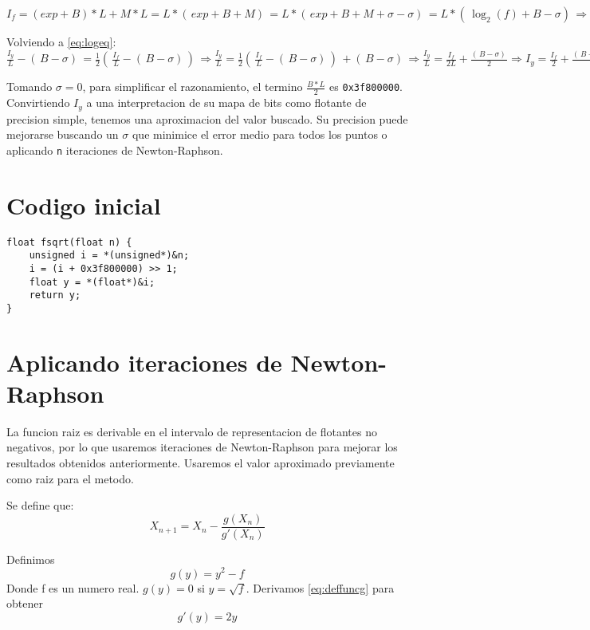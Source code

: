 \documentclass[]{article}
\begin{document}
\(I_f = (exp + B)*L + M*L = L*(\,exp+B+M)\,=L*(\,exp+B+M+\sigma-\sigma)\,=L*(\,\log_2(f)+B-\sigma)\,\Rightarrow\frac{I_f}{L}-(\,B-\sigma)\,=\log_2(f)\)

Volviendo a \eqref{eq:logeq}: \(\frac{I_y}{L}-(\,B-\sigma)\,=\frac{1}{2}(\, \frac{I_f}{L}-(\,B-\sigma)\,)\,\Rightarrow \frac{I_y}{L}=\frac{1}{2}(\,\frac{I_f}{L}-(\,B-\sigma)\,)\,+(\,B-\sigma)\,\Rightarrow  \frac{I_y}{L}=\frac{I_f}{2L}+\frac{(\,B-\sigma)\,}{2}\Rightarrow  I_y=\frac{I_f}{2}+\frac{(\,B-\sigma)\,*L}{2}\)

Tomando \(\sigma=0\), para simplificar el razonamiento, el termino \(\frac{B*L}{2}\) es \verb|0x3f800000|. Convirtiendo \(I_y\) a una interpretacion de su mapa de bits como flotante de precision simple, tenemos una aproximacion del valor buscado. Su precision puede mejorarse buscando un \(\sigma\) que minimice el error medio para todos los puntos o aplicando \verb|n| iteraciones de Newton-Raphson.
	
\section{Codigo inicial}
\begin{lstlisting}
float fsqrt(float n) {
	unsigned i = *(unsigned*)&n;
	i = (i + 0x3f800000) >> 1;
	float y = *(float*)&i;  
	return y;
}
\end{lstlisting}
	
\section{Aplicando iteraciones de Newton-Raphson}

La funcion raiz es derivable en el intervalo de representacion de flotantes no negativos, por lo que usaremos iteraciones de Newton-Raphson para mejorar los resultados obtenidos anteriormente. Usaremos el valor aproximado previamente como raiz para el metodo.

Se define que: 
\begin{equation}
X_{n+1}=X_n - \frac{g(X_n)}{g'(X_n)}
\end{equation} 

Definimos 
\begin{equation} \label{eq:deffuncg}
g(y)=y^{2}-f
\end{equation}
Donde f es un numero real. \(g(y)=0\) si \(y=\sqrt{f}\). Derivamos \eqref{eq:deffuncg} para obtener
\begin{equation}
g'(y)=2y
\end{equation}
\end{document}
